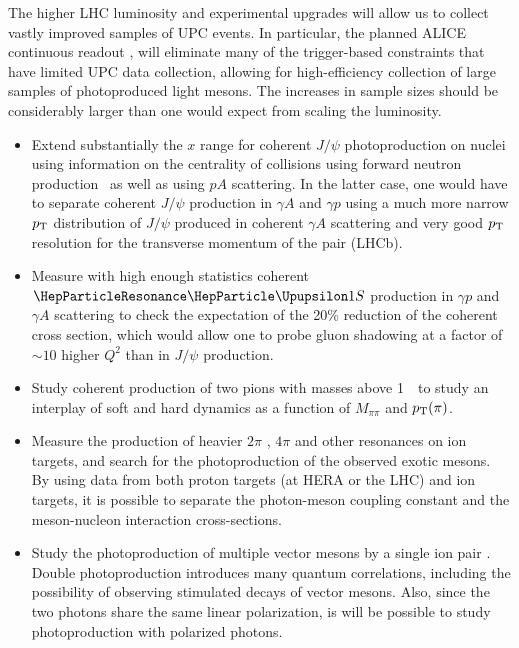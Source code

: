 \documentclass[../report.tex]{subfiles}
\begin{document}
The higher LHC luminosity and experimental upgrades will allow us to collect vastly improved samples of UPC events.   In particular, the planned ALICE continuous readout \cite{Krivda:2017sto}, will eliminate many of the trigger-based constraints that have limited UPC data collection, allowing for high-efficiency collection of large samples of photoproduced light mesons.   The increases in sample sizes should be considerably larger than one would expect from scaling the luminosity.  
\begin{itemize}
\item
Extend substantially the $x$ range for coherent $J/\psi$ photoproduction on nuclei
using information on the centrality of collisions using forward neutron production~\cite{Guzey:2013jaa}
 as well as using $pA$ scattering. In the latter case, one would have to separate coherent $J/\psi$ production in $\gamma A$ and $\gamma p$  using a much more narrow $p\sb{\scriptstyle\mathrm{T}}$ distribution of $J/\psi $ produced in coherent $\gamma A$ scattering
 and very good $p\sb{\scriptstyle\mathrm{T}}$ resolution for the transverse momentum of the pair (LHCb).
\item
Measure with high enough  statistics coherent $\PGUP{1S}$ production in $\gamma p$ and $\gamma A$
scattering to check the expectation of the 20\% reduction of the coherent cross section, which would allow one to probe gluon shadowing at a factor of $\sim 10 $ higher $Q^2$ than in $J/\psi$ production.
\item
Study coherent production of two pions with masses above 1~\UGeVcc\ to study an interplay of soft and hard dynamics as a function of $M_{\pi \pi}$ and $p\sb{\scriptstyle\mathrm{T}}(\pi)$.   
\item
Measure the production of heavier $2\pi$ \cite{Klein:2016dtn}, $4\pi$ and other resonances on ion targets, and search for the photoproduction of the observed exotic mesons.  
By using data from both proton targets (at HERA or the LHC) and ion targets, it is possible to separate the photon-meson coupling constant and the meson-nucleon interaction cross-sections.  
\item
Study the photoproduction of multiple vector mesons by a single ion pair \cite{Klein:1999qj}.   Double photoproduction introduces many quantum correlations, including the possibility of observing stimulated decays of vector mesons.  Also, since the two photons share the same linear polarization, is will be possible to study photoproduction with polarized photons.

\end{itemize}
\end{document}

